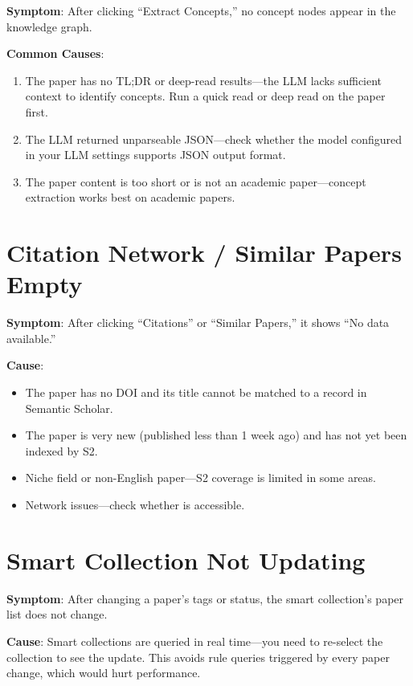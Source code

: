\textbf{Symptom}: After clicking ``Extract Concepts,'' no concept nodes appear in the
knowledge graph.

\textbf{Common Causes}:

\begin{enumerate}
  \item The paper has no TL;DR or deep-read results---the LLM lacks sufficient context
    to identify concepts. Run a quick read or deep read on the paper first.
  \item The LLM returned unparseable JSON---check whether the model configured in your
    LLM settings supports JSON output format.
  \item The paper content is too short or is not an academic paper---concept extraction
    works best on academic papers.
\end{enumerate}

\section{Citation Network / Similar Papers Empty}

\textbf{Symptom}: After clicking ``Citations'' or ``Similar Papers,'' it shows ``No
data available.''

\textbf{Cause}:

\begin{itemize}
  \item The paper has no DOI and its title cannot be matched to a record in Semantic
    Scholar.
  \item The paper is very new (published less than 1 week ago) and has not yet been
    indexed by S2.
  \item Niche field or non-English paper---S2 coverage is limited in some areas.
  \item Network issues---check whether  is accessible.
\end{itemize}

\section{Smart Collection Not Updating}

\textbf{Symptom}: After changing a paper's tags or status, the smart collection's
paper list does not change.

\textbf{Cause}: Smart collections are queried in real time---you need to re-select the
collection to see the update. This avoids rule queries triggered by every paper change,
which would hurt performance.

